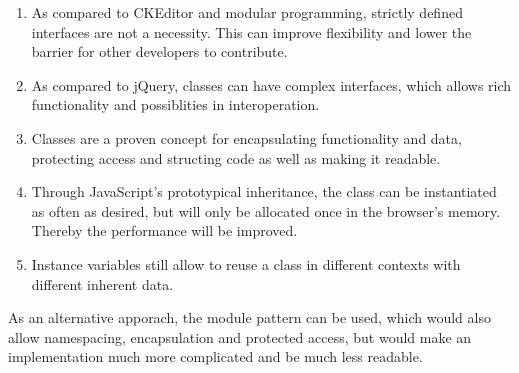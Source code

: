 \begin{enumerate}
\item As compared to CKEditor and modular programming, strictly defined interfaces are not a necessity. This can improve flexibility and lower the barrier for other developers to contribute. %
\item As compared to jQuery, classes can have complex interfaces, which allows rich functionality and possiblities in interoperation.
\item Classes are a proven concept for encapsulating functionality and data, protecting access and structing code as well as making it readable.
\item Through JavaScript's prototypical inheritance, the class can be instantiated as often as desired, but will only be allocated once in the browser's memory. Thereby the performance will be improved.
\item Instance variables still allow to reuse a class in different contexts with different inherent data. %
\end{enumerate}

As an alternative apporach, the module pattern can be used, which would also allow namespacing, encapsulation and protected access, but would make an implementation much more complicated and be much less readable.



